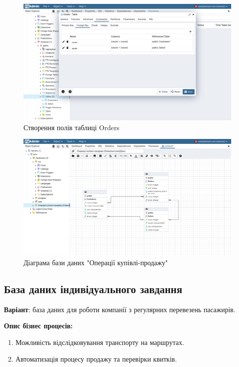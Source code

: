 \documentclass[14pt]{extreport}
\begin{document}
\begin{normalsize}
	\begin{figure}[H]
		\centering
		\includegraphics[scale=0.35]{15}
		\caption{Створення полів таблиці Orders}
	\end{figure}
	\fi
	\begin{figure}[H]
		\centering
		\includegraphics[scale=0.35]{16}
		\caption{Діаграма бази даних "Операції купівлі-продажу"}
	\end{figure}

	\subsection*{База даних індивідуального завдання}
	\textbf{Варіант}: база даних для роботи компанії з регулярних перевезень пасажирів.
	
	\noindent\textbf{Опис бізнес процесів:}
	\begin{enumerate}
		\item Можливість відслідковування транспорту на маршрутах.
		\item Автоматизація процесу продажу та перевірки квитків.
	\end{enumerate}


\end{normalsize}
\end{document}
